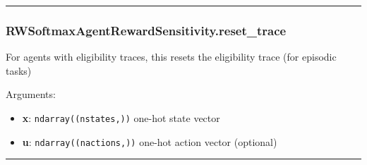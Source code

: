 \begin{center}\rule{0.5\linewidth}{\linethickness}\end{center}

\hypertarget{rwsoftmaxagentrewardsensitivity.reset_trace}{%
\subsubsection{RWSoftmaxAgentRewardSensitivity.reset\_trace}\label{rwsoftmaxagentrewardsensitivity.reset_trace}}

\begin{Shaded}
\begin{Highlighting}[]
\OperatorTok{=}\NormalTok{)}
\end{Highlighting}
\end{Shaded}

For agents with eligibility traces, this resets the eligibility trace
(for episodic tasks)

Arguments:

\begin{itemize}
\tightlist
\item
  \textbf{x}: \texttt{ndarray((nstates,))} one-hot state vector
\item
  \textbf{u}: \texttt{ndarray((nactions,))} one-hot action vector
  (optional)
\end{itemize}

\begin{center}\rule{0.5\linewidth}{\linethickness}\end{center}

